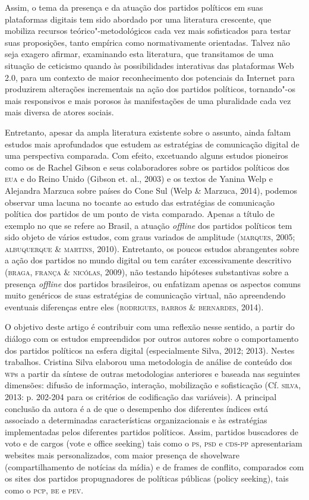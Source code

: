 Assim, o tema da presença e da atuação dos partidos políticos em suas
plataformas digitais tem sido abordado por uma literatura crescente, que
mobiliza recursos teórico"-metodológicos cada vez mais sofisticados para
testar suas proposições, tanto empírica como normativamente orientadas.
Talvez não seja exagero afirmar, examinando esta literatura, que
transitamos de uma situação de ceticismo quando às possibilidades
interativas das plataformas Web 2.0, para um contexto de maior
reconhecimento dos potenciais da Internet para produzirem alterações
incrementais na ação dos partidos políticos, tornando"-os mais
responsivos e mais porosos às manifestações de uma pluralidade cada vez
mais diversa de atores sociais.

Entretanto, apesar da ampla literatura existente sobre o assunto, ainda
faltam estudos mais aprofundados que estudem as estratégias de
comunicação digital de uma perspectiva comparada. Com efeito, excetuando
alguns estudos pioneiros como os de Rachel Gibson e seus colaboradores
sobre os partidos políticos dos \textsc{eua} e do Reino Unido (Gibson et. al.,
2003) e os textos de Yanina Welp e Alejandra Marzuca sobre países do
Cone Sul (Welp \& Marzuca, 2014), podemos observar uma lacuna no tocante
ao estudo das estratégias de comunicação política dos partidos de um
ponto de vista comparado. Apenas a título de exemplo no que se refere ao
Brasil, a atuação \emph{offline} dos partidos políticos tem sido objeto de
vários estudos, com graus variados de amplitude (\textsc{marques}, 2005;
\textsc{albuquerque} \& \textsc{martins}, 2010). Entretanto, os poucos estudos abrangentes
sobre a ação dos partidos no mundo digital ou tem caráter excessivamente
descritivo (\textsc{braga}, \textsc{frança} \& \textsc{nicólas}, 2009), não testando hipóteses
substantivas sobre a presença \emph{offline} dos partidos brasileiros, ou
enfatizam apenas os aspectos comuns muito genéricos de suas estratégias
de comunicação virtual, não apreendendo eventuais diferenças entre eles
(\textsc{rodrigues}, \textsc{barros} \& \textsc{bernardes}, 2014).

O objetivo deste artigo é contribuir com uma reflexão nesse sentido, a
partir do diálogo com os estudos empreendidos por outros autores sobre o
comportamento dos partidos políticos na esfera digital (especialmente
Silva, 2012; 2013). Nestes trabalhos. Cristina Silva elaborou uma
metodologia de análise de conteúdo dos \textsc{wp}s a partir da síntese de outras
metodologias anteriores e baseada nas seguintes dimensões: difusão de
informação, interação, mobilização e sofisticação (Cf. \textsc{silva}, 2013: p.
202-204 para os critérios de codificação das variáveis). A principal
conclusão da autora é a de que o desempenho dos diferentes índices está
associado a determinadas características organizacionais e às
estratégias implementadas pelos diferentes partidos políticos. Assim,
partidos buscadores de voto e de cargos (vote e office seeking) tais
como o \textsc{ps}, \textsc{psd} e \textsc{cds}-\textsc{pp} apresentariam websites mais personalizados, com
maior presença de shovelware (compartilhamento de notícias da mídia) e
de frames de conflito, comparados com os sites dos partidos
propugnadores de políticas públicas (policy seeking), tais como o \textsc{pcp},
\textsc{be} e \textsc{pev}.

